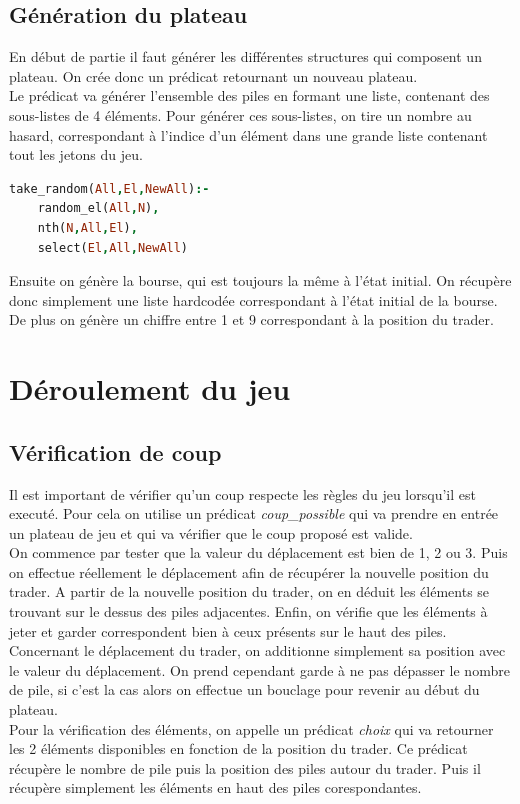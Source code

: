\documentclass[11pt,a4paper,twoside,french,svgnames]{report}
\begin{document}
\subsection{Génération du plateau}
En début de partie il faut générer les différentes structures qui composent un plateau. On crée donc un prédicat retournant un nouveau plateau.\\
Le prédicat va générer l'ensemble des piles en formant une liste, contenant des sous-listes de 4 éléments. Pour générer ces sous-listes, on tire un nombre au hasard, correspondant à l'indice d'un élément dans une grande liste contenant tout les jetons du jeu.
\begin{lstlisting}[language=prolog]
take_random(All,El,NewAll):-
	random_el(All,N),
	nth(N,All,El),
	select(El,All,NewAll)
\end{lstlisting}
Ensuite on génère la bourse, qui est toujours la même à l'état initial. On récupère donc simplement une liste hardcodée correspondant à l'état initial de la bourse.\\
De plus on génère un chiffre entre 1 et 9 correspondant à la position du trader.

\section{Déroulement du jeu}
\subsection{Vérification de coup}
Il est important de vérifier qu'un coup respecte les règles du jeu lorsqu'il est executé. Pour cela on utilise un prédicat \textit{coup\_possible} qui va prendre en entrée un plateau de jeu et qui va vérifier que le coup proposé est valide. \\
On commence par tester que la valeur du déplacement est bien de 1, 2 ou 3. Puis on effectue réellement le déplacement afin de récupérer la nouvelle position du trader. A partir de la nouvelle position du trader, on en déduit les éléments se trouvant sur le dessus des piles adjacentes. Enfin, on vérifie que les éléments à jeter et garder correspondent bien à ceux présents sur le haut des piles.\\
Concernant le déplacement du trader, on additionne simplement sa position avec le valeur du déplacement. On prend cependant garde à ne pas dépasser le nombre de pile, si c'est la cas alors on effectue un bouclage pour revenir au début du plateau.\\
Pour la vérification des éléments, on appelle un prédicat \textit{choix} qui va retourner les 2 éléments disponibles en fonction de la position du trader. Ce prédicat récupère le nombre de pile puis la position des piles autour du trader. Puis il récupère simplement les éléments en haut des piles corespondantes.
\end{document}
